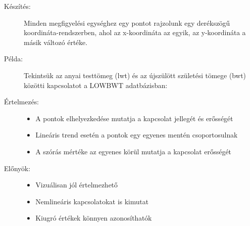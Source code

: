 \documentclass[a4paper,12pt]{article}
\begin{document}
    \begin{description}
        \item[Készítés:] Minden megfigyelési egységhez egy pontot rajzolunk egy derékszögű koordináta-rendszerben, ahol az x-koordináta az egyik, az y-koordináta a másik változó értéke.

        \item[Példa:] Tekintsük az anyai testtömeg (lwt) és az újszülött születési tömege (bwt) közötti kapcsolatot a LOWBWT adatbázisban:

        \begin{center}
        \end{center}

        \item[Értelmezés:]
        \begin{itemize}
            \item A pontok elhelyezkedése mutatja a kapcsolat jellegét és erősségét
            \item Lineáris trend esetén a pontok egy egyenes mentén csoportosulnak
            \item A szórás mértéke az egyenes körül mutatja a kapcsolat erősségét
        \end{itemize}

        \item[Előnyök:]
        \begin{itemize}
            \item Vizuálisan jól értelmezhető
            \item Nemlineáris kapcsolatokat is kimutat
            \item Kiugró értékek könnyen azonosíthatók
        \end{itemize}
    \end{description}
\end{document}
